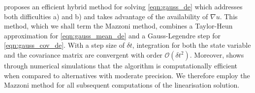 \citet{Mazzoni_2008_ComputationalAspectsContinuous} proposes an efficient hybrid method for solving \cref{eqn:gauss_de} which addresses both difficulties a) and b) and takes advantage of the availability of \(\nabla u\).
This method, which we shall term the Mazzoni method, combines a Taylor-Heun approximation for \cref{eqn:gauss_mean_de} and a Gauss-Legendre step for \cref{eqn:gauss_cov_de}.
With a step size of \(\delta t\), integration for both the state variable and the covariance matrix are convergent with order \(\mathcal{O}\!\left(\delta t^2\right)\).
Moreover, \citet{Mazzoni_2008_ComputationalAspectsContinuous} shows through numerical simulations that the algorithm is computationally efficient when compared to alternatives with moderate precision.
We therefore employ the Mazzoni method for all subsequent computations of the linearisation solution.

